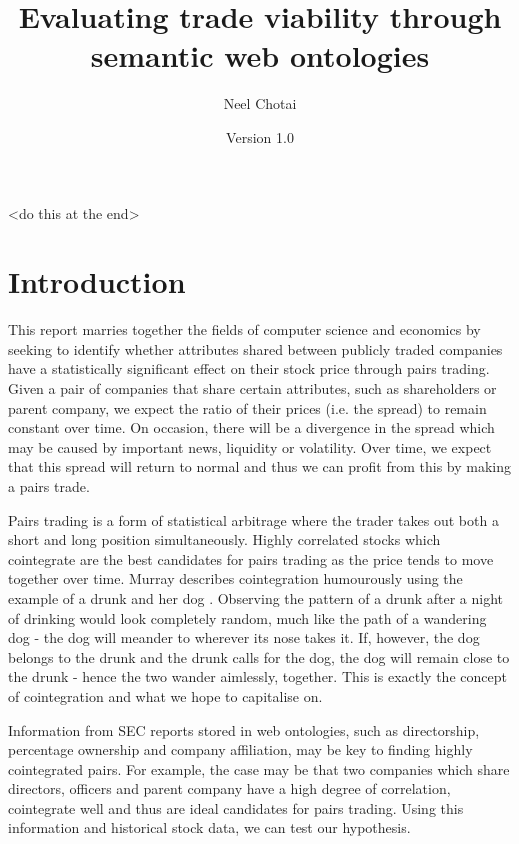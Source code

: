 \documentclass{UoYCSproject}
\author{Neel Chotai}
\title{Evaluating trade viability through semantic web ontologies}
\date{Version 1.0}
\begin{document}
\maketitle
\listoffigures
\listoftables

\begin{summary}
<do this at the end>
\end{summary}

\chapter{Introduction}
\label{cha:Introduction}

This report marries together the fields of computer science and economics by seeking to identify whether attributes shared between publicly traded companies have a statistically significant effect on their stock price through pairs trading. Given a pair of companies that share certain attributes, such as shareholders or parent company, we expect the ratio of their prices (i.e. the spread) to remain constant over time. On occasion, there will be a divergence in the spread which may be caused by important news, liquidity or volatility. Over time, we expect that this spread will return to normal and thus we can profit from this by making a pairs trade.

Pairs trading is a form of statistical arbitrage where the trader takes out both a short and long position simultaneously. Highly correlated stocks which cointegrate are the best candidates for pairs trading as the price tends to move together over time. Murray describes cointegration humourously using the example of a drunk and her dog \parencite{drunkdog}. Observing the pattern of a drunk after a night of drinking would look completely random, much like the path of a wandering dog - the dog will meander to wherever its nose takes it. If, however, the dog belongs to the drunk and the drunk calls for the dog, the dog will remain close to the drunk - hence the two wander aimlessly, together. This is exactly the concept of cointegration and what we hope to capitalise on.

Information from SEC reports stored in web ontologies, such as directorship, percentage ownership and company affiliation, may be key to finding highly cointegrated pairs. For example, the case may be that two companies which share directors, officers and parent company have a high degree of correlation, cointegrate well and thus are ideal candidates for pairs trading. Using this information and historical stock data, we can test our hypothesis.
\end{document}
